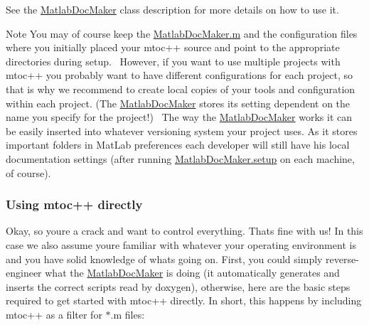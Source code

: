 See the \hyperlink{class_matlab_doc_maker}{Matlab\+Doc\+Maker} class description for more details on how to use it. \begin{DoxyNote}{Note}
You may of course keep the \hyperlink{_matlab_doc_maker_8m_source}{Matlab\+Doc\+Maker.\+m} and the configuration files where you initially placed your mtoc++ source and point to the appropriate directories during setup.~\newline
 However, if you want to use multiple projects with mtoc++ you probably want to have different configurations for each project, so that is why we recommend to create local copies of your tools and configuration within each project. (The \hyperlink{class_matlab_doc_maker}{Matlab\+Doc\+Maker} stores its setting dependent on the name you specify for the project!)~\newline
 The way the \hyperlink{class_matlab_doc_maker}{Matlab\+Doc\+Maker} works it can be easily inserted into whatever versioning system your project uses. As it stores important folders in Mat\+Lab preferences each developer will still have his local documentation settings (after running \hyperlink{class_matlab_doc_maker_a434c176c2421dd18a40003919b19f4f2}{Matlab\+Doc\+Maker.\+setup} on each machine, of course).
\end{DoxyNote}
\hypertarget{tools_tools_direct}{}\subsubsection{Using mtoc++ directly}\label{tools_tools_direct}
Okay, so you\textquotesingle{}re a crack and want to control everything. That\textquotesingle{}s fine with us! In this case we also assume you\textquotesingle{}re familiar with whatever your operating environment is and you have solid knowledge of what\textquotesingle{}s going on. First, you could simply reverse-\/engineer what the \hyperlink{class_matlab_doc_maker}{Matlab\+Doc\+Maker} is doing (it automatically generates and inserts the correct scripts read by doxygen), otherwise, here are the basic steps required to get started with mtoc++ directly. In short, this happens by including mtoc++ as a filter for $\ast$.m files\+:
